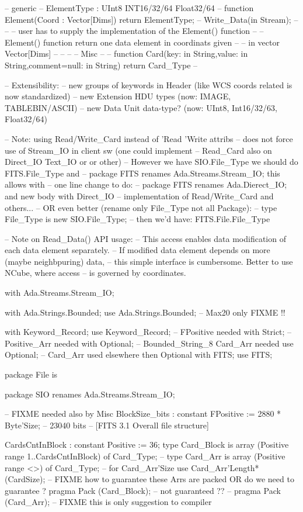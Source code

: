 -- generic
--  ElementType : UInt8 INT16/32/64 Float32/64
--  function Element(Coord : Vector[Dims]) return ElementType;
-- Write_Data(in Stream);
--
-- -- user has to supply the implementation of the Element() function
-- -- Element() function return one data element in coordinats given
-- -- in vector Vector[Dims]
--
--
--
-- Misc
--
-- function Card(key: in String,value: in String,comment=null: in String) return Card_Type
--

-- Extensibility:
-- new groups of keywords in Header (like WCS coords related is now standardized)
-- new Extension HDU types (now: IMAGE, TABLEBIN/ASCII)
-- new Data Unit data-type? (now: UInt8, Int16/32/63, Float32/64)

-- Note: using Read/Write_Card instead of 'Read 'Write attribs
-- does not force use of Stream_IO in client sw (one could implement
-- Read_Card also on Direct_IO Text_IO or or other)
-- However we have SIO.File_Type we should do FITS.File_Type and
-- package FITS renames Ada.Streams.Stream_IO; this allows with
-- one line change to do:
-- package FITS renames Ada.Dierect_IO; and new body with Direct_IO
-- implementation of Read/Write_Card and others...
-- OR even better (rename only File_Type not all Package):
-- type File_Type is new SIO.File_Type;
-- then we'd have: FITS.File.File_Type

-- Note on Read_Data() API usage:
-- This access enables data modification of each data element separately.
-- If modified data element depends on more (maybe neighbpuring) data,
-- this simple interface is cumbersome. Better to use NCube, where access
-- is governed by coordinates.


with Ada.Streams.Stream_IO;

with Ada.Strings.Bounded; use Ada.Strings.Bounded; -- Max20 only FIXME !!

with Keyword_Record; use Keyword_Record; -- FPositive needed
with Strict; -- Positive_Arr needed
with Optional; -- Bounded_String_8 Card_Arr needed 
use Optional; -- Card_Arr used elsewhere then Optional
with FITS; use FITS;

package File is

   package SIO renames Ada.Streams.Stream_IO;

   -- FIXME needed also by Misc
   BlockSize_bits : constant FPositive := 2880 * Byte'Size; -- 23040 bits
    -- [FITS 3.1 Overall file structure]

   CardsCntInBlock : constant Positive := 36;
   type Card_Block is array (Positive range 1..CardsCntInBlock) of Card_Type;
--   type Card_Arr   is array (Positive range <>)                 of Card_Type;
--   for Card_Arr'Size use Card_Arr'Length*(CardSize);
-- FIXME how to guarantee these Arrs are packed OR do we need to guarantee ?
   pragma Pack (Card_Block); -- not guaranteed ??
-- pragma Pack (Card_Arr);   -- FIXME this is only suggestion to compiler



